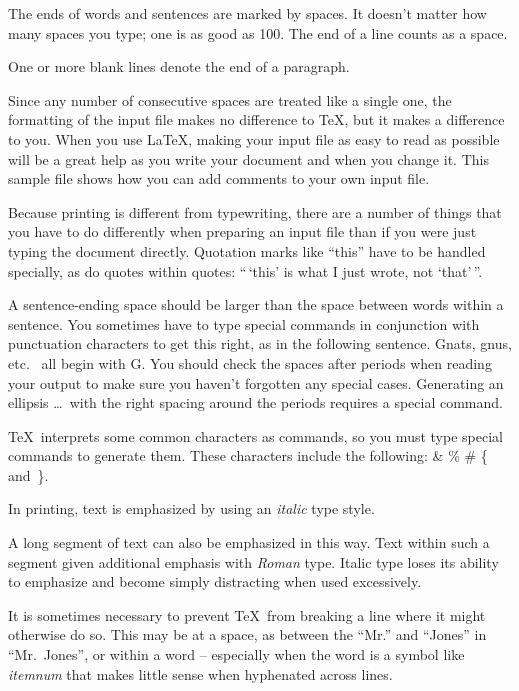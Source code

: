 \documentclass[amsa]{ipart}
\begin{document}
The ends  of words and sentences are marked
  by   spaces. It  doesn't matter how many
spaces    you type; one is as good as 100.  The
end of   a line counts as a space.

One   or more   blank lines denote the  end
of  a paragraph.

Since any number of consecutive spaces are treated like a single
one, the formatting of the input file makes no difference to
      \TeX,
but it makes a difference to you.
When you use
      \LaTeX,
making your input file as easy to read as possible
will be a great help as you write your document and when you
change it.  This sample file shows how you can add comments to
your own input file.

Because printing is different from typewriting, there are a
number of things that you have to do differently when preparing
an input file than if you were just typing the document directly.
Quotation marks like       ``this''
have to be handled specially, as do quotes within quotes:
       ``\,`this'
    is what I just
    wrote, not  `that'\,''.


A sentence-ending space should be larger than the space between words
within a sentence.  You sometimes have to type special commands in
conjunction with punctuation characters to get this right, as in the
following sentence.
       Gnats, gnus, etc.\    %
       all begin with G\@.   %
You should check the spaces after periods when reading your output to
make sure you haven't forgotten any special cases.
Generating an ellipsis
       \ldots\
with the right spacing around the periods
requires a special  command.

\TeX\ interprets some common characters as commands, so you must type
special commands to generate them.  These characters include the
following:
       \& \% \# \{ and~\}.

In printing, text is emphasized by using an        {\em italic\/} type style.

\begin{em}
   A long segment of text can also be emphasized in this way.  Text within
   such a segment given additional emphasis
      with\/ {\em Roman}
   type.  Italic type loses its ability to emphasize and become simply
   distracting when used excessively.
\end{em}

It is sometimes necessary to prevent \TeX\ from breaking a line where
it might otherwise do so.  This may be at a space, as between the
``Mr.'' and ``Jones'' in        ``Mr.~Jones'',
or within a word -- especially when the word is a symbol like
       \mbox{\em itemnum\/}
that makes little sense when hyphenated across
       lines.
\end{document}
